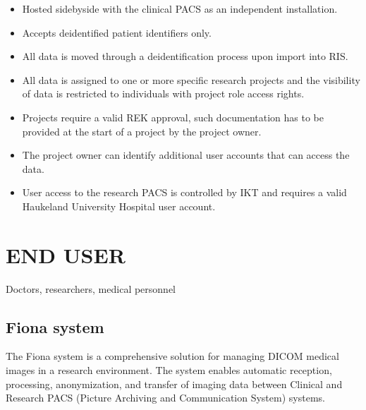 \documentclass[letterpaper,10pt,english]{sphinxmanual}
\begin{document}
\begin{itemize}
\item {} 
\sphinxAtStartPar
Hosted side\sphinxhyphen{}by\sphinxhyphen{}side with the clinical PACS as an independent installation.

\item {} 
\sphinxAtStartPar
Accepts de\sphinxhyphen{}identified patient identifiers only.

\item {} 
\sphinxAtStartPar
All data is moved through a de\sphinxhyphen{}identification process upon import into RIS.

\item {} 
\sphinxAtStartPar
All data is assigned to one or more specific research projects and the visibility of data is restricted to individuals with project role access rights.

\item {} 
\sphinxAtStartPar
Projects require a valid REK approval, such documentation has to be provided at the start of a project by the project owner.

\item {} 
\sphinxAtStartPar
The project owner can identify additional user accounts that can access the data.

\item {} 
\sphinxAtStartPar
User access to the research PACS is controlled by IKT and requires a valid Haukeland University Hospital user account.

\end{itemize}

\sphinxstepscope


\section{END USER}
\label{\detokenize{EndUser/index:end-user}}\label{\detokenize{EndUser/index::doc}}
\sphinxAtStartPar
{} Doctors, researchers, medical personnel


\subsection{Fiona system}
\label{\detokenize{EndUser/index:fiona-system}}
\sphinxAtStartPar
The Fiona system is a comprehensive solution for managing DICOM medical images in a research environment. The system enables automatic reception, processing, anonymization, and transfer of imaging data between Clinical and Research PACS (Picture Archiving and Communication System) systems.
\end{document}
